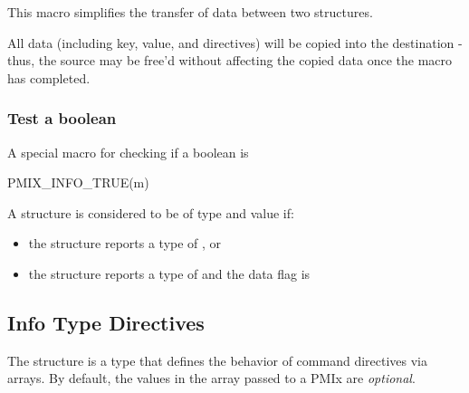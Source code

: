 \begin{arglist}
\end{arglist}

This macro simplifies the transfer of data between two structures.

\adviceuserstart
All data (including key, value, and directives) will be copied into the destination  - thus, the source  may be free'd without affecting the copied data once the macro has completed.
\adviceuserend


\subsubsection{Test a boolean }

A special macro for checking if a boolean  is 

\cspecificstart
\begin{codepar}
PMIX_INFO_TRUE(m)
\end{codepar}
\cspecificend

\begin{arglist}
\end{arglist}

A  structure is considered to be of type  and value  if:

\begin{itemize}
    \item the structure reports a type of , or
    \item the structure reports a type of  and the data flag is 
\end{itemize}

\subsection{Info Type Directives}

The  structure is a  type that defines the behavior of command directives via  arrays.
By default, the values in the  array passed to a PMIx are \emph{optional}.

